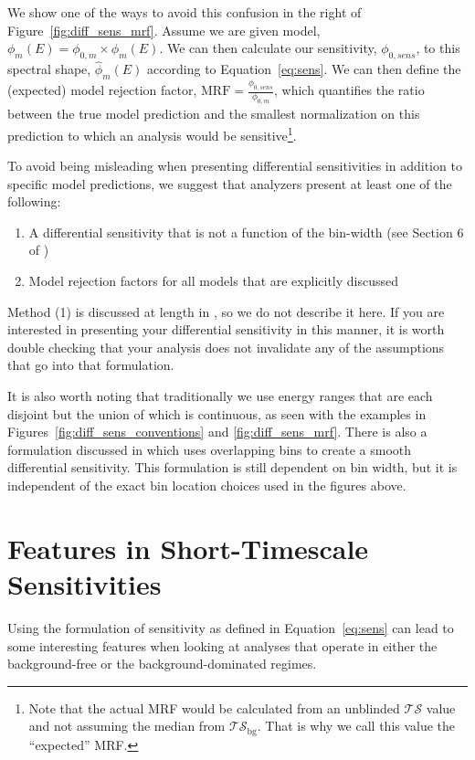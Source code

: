 \documentclass[a4paper,11pt]{article}
\newcommand\ts{\mathcal{TS}}
\newcommand\tsbg{\mathcal{TS_{\mathrm{bg}}}}
\begin{document}
We show one of the ways to avoid this confusion in the right of Figure~\ref{fig:diff_sens_mrf}. Assume we are given model, $\phi_m(E) = \phi_{0,m}\times\hat{\phi}_m(E)$. We can then calculate our sensitivity, $\phi_{0,sens}$, to this spectral shape, $\hat{\phi}_m(E)$ according to Equation~\ref{eq:sens}. We can then define the (expected) model rejection factor, $\textrm{MRF} = \frac{\phi_{0,sens}}{\phi_{0,m}}$, which quantifies the ratio between the true model prediction and the smallest normalization on this prediction to which an analysis would be sensitive\footnote{Note that the actual MRF would be calculated from an unblinded $\ts$ value and not assuming the median from $\tsbg$. That is why we call this value the ``expected'' MRF.}.

To avoid being misleading when presenting differential sensitivities in addition to specific model predictions, we suggest that analyzers present at least one of the following:
\begin{enumerate}
    \item \vspace{-3pt}A differential sensitivity that is not a function of the bin-width (see Section 6 of \cite{Rene:differential})
    \item \vspace{-6pt} Model rejection factors for all models that are explicitly discussed
\end{enumerate}

Method (1) is discussed at length in \cite{Rene:differential}, so we do not describe it here. If you are interested in presenting your differential sensitivity in this manner, it is worth double checking that your analysis does not invalidate any of the assumptions that go into that formulation.

It is also worth noting that traditionally we use energy ranges that are each disjoint but the union of which is continuous, as seen with the examples in Figures~\ref{fig:diff_sens_conventions} and \ref{fig:diff_sens_mrf}. There is also a formulation discussed in \cite{IceCube:2018fhm} which uses overlapping bins to create a smooth differential sensitivity. This formulation is still dependent on bin width, but it is independent of the exact bin location choices used in the figures above.

\section{Features in Short-Timescale Sensitivities}
Using the formulation of sensitivity as defined in Equation~\ref{eq:sens} can lead to some interesting features when looking at analyses that operate in either the background-free or the background-dominated regimes. 
\end{document}
